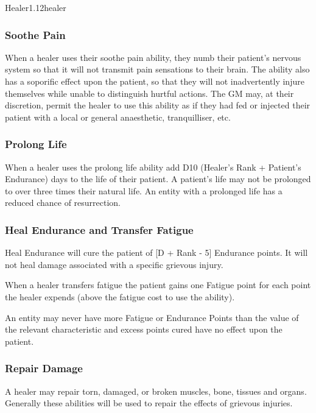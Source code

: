 \begin{skill*}{Healer}{1.12}{healer}
\subsubsection{Soothe Pain}

When a healer uses their soothe pain ability, they numb their
patient's nervous system so that it will not transmit pain sensations
to their brain. The ability also has a soporific effect upon the
patient, so that they will not inadvertently injure themselves while
unable to distinguish hurtful actions. The GM may, at their
discretion, permit the healer to use this ability as if they had fed
or injected their patient with a local or general anaesthetic,
tranquilliser, etc.

\subsubsection{Prolong Life}
When a healer uses the prolong life ability add D10 \x (Healer's Rank +
Patient's Endurance) days to the life of their patient. A patient's
life may not be prolonged to over three times their natural life. An
entity with a prolonged life has a reduced chance of resurrection.

\subsubsection{Heal Endurance and Transfer Fatigue}

Heal Endurance will cure the patient of [D + Rank - 5] Endurance
points.  It will not heal damage associated with a specific grievous
injury.

When a healer transfers fatigue the patient gains one Fatigue point
for each point the healer expends (above the fatigue cost to use the
ability).

An entity may never have more Fatigue or Endurance Points than the
value of the relevant characteristic and excess points cured have no
effect upon the patient.

\subsubsection{Repair Damage}

A healer may repair torn, damaged, or broken muscles, bone, tissues
and organs.  Generally these abilities will be used to repair the
effects of grievous injuries.


\end{skill*}
